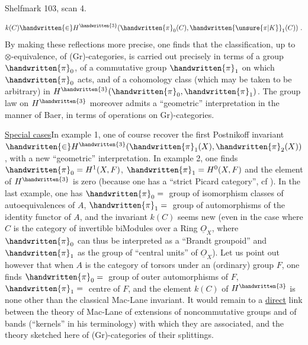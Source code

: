 Shelfmark 103, scan 4.

\[
k(C)\handwritten{\in}H^{\handwritten{3}}(\handwritten{\pi}_{0}(C),\handwritten{\unsure{\pi|K}}_{1}(C))\ .
\]
By making these reflections more precise, one finds that the classification, up to $\otimes$-equivalence, of (Gr)-categories, is carried out precisely in terms of a group $\handwritten{\pi}_{0}$, of a commutative group $\handwritten{\pi}_{1}$ on which $\handwritten{\pi}_{0}$ acts, and of a cohomology class (which may be taken to be arbitrary) in $H^{\handwritten{3}}(\handwritten{\pi}_{0},\handwritten{\pi}_{1})$. The  group law on $H^{\handwritten{3}}$ moreover admits a ``geometric'' interpretation in the manner of Baer, in terms of operations on \handwritten{(}Gr)-categories.

\uline{Special cases}\quad In example 1, one  of course recover the first Postnikoff invariant $\handwritten{\in}H^{\handwritten{3}}(\handwritten{\pi}_{1}(X),\handwritten{\pi}_{2}(X))$, with a new ``geo\deleted{\unsure{(}}metric'' interpretation. In example 2, one finds $\handwritten{\pi}_{0}=H^{1}(X,F)$, $\handwritten{\pi}_{1}=H^{0}(X,F)$\handwritten{,} and the element of $H^{\handwritten{3}}$ is zero (because one has a ``strict Picard category'', cf \handwritten{[\, ]}). In  the last example, one has $\handwritten{\pi}_{0}={}$ group of isomorphism classes of autoequivalences of $A$, $\handwritten{\pi}_{1}={}$ group of automorphisms of the identity functor of $A$, and the invariant $k(C)$ seems new (even in the case where $C$ is the category of invertible biModules over a Ring $\underline{O}_{X}$, where $\handwritten{\pi}_{0}$ can thus be interpreted as a ``Brandt groupoid'' and $\handwritten{\pi}_{1}$ as the group of ``central units'' of $\underline{O}_{X}$). Let us point out however that when $A$ is the category of torsors under an (ordinary) group $F$, one finds  $\handwritten{\pi}_{0}={}$ group of outer automorphisms of $F$, $\handwritten{\pi}_{1}={}$ centre of $F$, and the element $k(C)$ of $H^{\handwritten{3}}$ is none other than the classical Mac-Lane invariant. It would remain to  a  \uline{direct} link between the theory of Mac-Lane of extensions of noncommutative groups and of bands (``kernels''\deleted{\unsure{)|,}} in his terminology) with which they are associated, and the theory  sketched here of (Gr)-categories  of their splittings.


